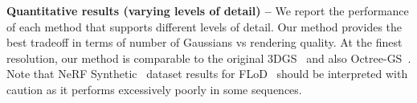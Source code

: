 \begin{table}[!t]
  \centering
  \resizebox{\linewidth}{!}{
    \firstoption
  }
  \caption[Quantitative comparison between \clog and chosen baselines under varying levels of detail]{\textbf{Quantitative results (varying levels of detail) --}
    We report the performance of each method that supports different levels of
    detail.
    Our method provides the best tradeoff in terms of number of Gaussians vs
    rendering quality.
    At the finest resolution, our method is comparable to the original
    3DGS~\cite{kerbl20233d} and also Octree-GS~\cite{ren2024octree}.
    Note that NeRF Synthetic~\cite{mildenhall2020nerf} dataset results for
    FLoD~\cite{seo2024flod} should be interpreted with caution as it performs
    excessively poorly in some sequences.
  }
  \label{tab:clog-lod}
\end{table}